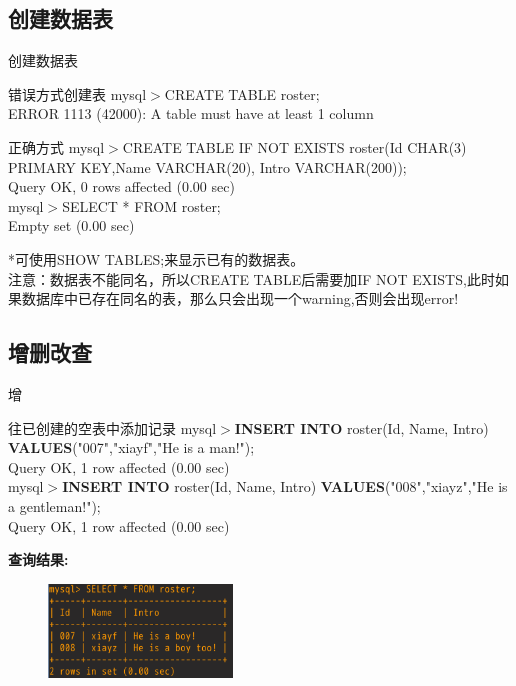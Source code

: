 \documentclass[CJK]{beamer}
\begin{document}
\begin{CJK*}{UTF8}{gbsn}
\subsection{创建数据表}
\begin{frame}{创建数据表}
	\begin{block}{错误方式创建表}
	mysql$>$CREATE TABLE roster;\\
	{\color{blue}ERROR 1113 (42000): A table must have at least 1 column}
	\end{block}
	\begin{block}{正确方式}
	mysql$>${\color{green}CREATE TABLE IF NOT EXISTS} {\color{red}roster}({\color{red}Id} {\color{green}CHAR(3) PRIMARY KEY},{\color{red}Name} {\color{green}VARCHAR(20)}, {\color{red}Intro} {\color{green}VARCHAR(200)});\\
	{\color{blue}Query OK, 0 rows affected (0.00 sec)}\\
	mysql$>$SELECT * FROM roster;\\
	{\color{blue}Empty set (0.00 sec)}
	\end{block}
	\tiny{*可使用SHOW TABLES;来显示已有的数据表。}\\
	\tiny{{\color{red}注意}：数据表不能同名，所以CREATE TABLE后需要加IF NOT EXISTS,此时如果数据库中已存在同名的表，那么只会出现一个warning,否则会出现error!}
\end{frame}

\subsection{增删改查}
\begin{frame}{增}
	\begin{block}{往已创建的空表中添加记录}
	mysql$>${\bf INSERT INTO} roster(Id, Name, Intro) {\bf VALUES}("007","xiayf","He is a man!");\\
	{\color{blue}Query OK, 1 row affected (0.00 sec)}\\
	mysql$>${\bf INSERT INTO} roster(Id, Name, Intro) {\bf VALUES}("008","xiayz","He is a gentleman!");\\
	{\color{blue}Query OK, 1 row affected (0.00 sec)}
	\end{block}
	{\bf 查询结果:}
	\begin{center}
	\begin{figure}
	\includegraphics[height=2.5cm]{select.png}
	\end{figure}
	\end{center}
\end{frame}


\end{CJK*}
\end{document}
